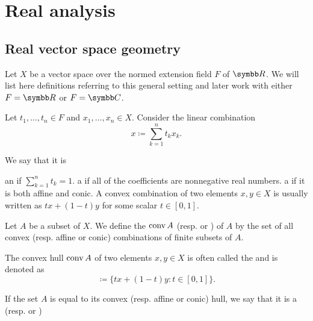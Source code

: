 \section{Real analysis}\label{sec:real_analysis}
\subsection{Real vector space geometry}\label{subsec:real_vector_space_geometry}

\begin{remark}\label{remark:geometry_of_vector_spaces}
  Let \( X \) be a vector space over the normed extension field \( F \) of \( \R \). We will list here definitions referring to this general setting and later work with either \( F = \R \) or \( F = \C \).
\end{remark}

\begin{definition}\label{def:special_linear_combinations}
  Let \( t_1, \ldots, t_n \in F \) and \( x_1, \ldots, x_n \in X \). Consider the linear combination
  \begin{equation*}
    x \coloneqq \sum_{k=1}^n t_k x_k.
  \end{equation*}

  We say that it is
  \begin{defenum}
     an  if \( \sum_{k=1}^n t_k = 1 \).
     a  if all of the coefficients are nonnegative real numbers.
     a  if it is both affine and conic. A convex combination of two elements \( x, y \in X \) is usually written as \( tx + (1-t)y \) for some scalar \( t \in [0, 1] \).
  \end{defenum}
\end{definition}

\begin{definition}\label{def:linear_combination_hulls}
  Let \( A \) be a subset of \( X \). We define the  \( \operatorname{conv} A \) (resp.  or ) of \( A \) by the set of all convex (resp. affine or conic) combinations of finite subsets of \( A \).

  The convex hull \( \operatorname{conv} A \) of two elements \( x, y \in X \) is often called the  and is denoted as
  \begin{equation*}
    [x, y] \coloneqq \{ tx + (1-t)y \colon t \in [0, 1] \}.
  \end{equation*}

  If the set \( A \) is equal to its convex (resp. affine or conic) hull, we say that it is a  (resp.  or )
\end{definition}

